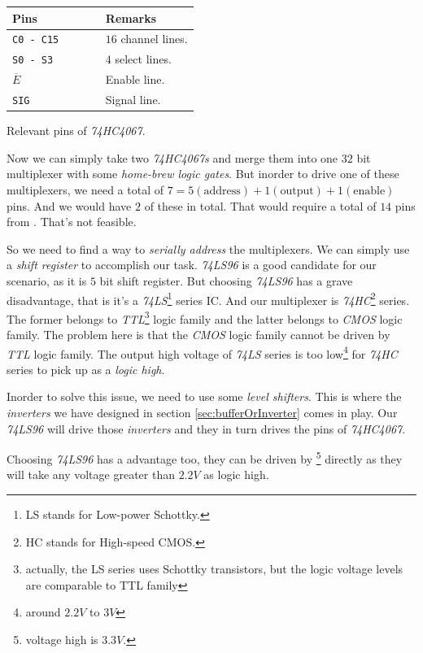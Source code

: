 \documentclass[../../main]{subfiles}
\begin{document}
\begin{center}
{\begin{minipage}[c] {0.52\textwidth}
    \end{minipage}}

\end{center}

\begin{center}
    \begin{xltabular} {\linewidth} {
            *{1}{>{\centering\arraybackslash}m{0.5\linewidth}}
            *{1}{>{\centering\arraybackslash}m{0.5\linewidth}}
        }
        \toprule
        Pins & Remarks \\
        \midrule
        \texttt{C0 - C15} & $16$ channel lines. \\
        \texttt{S0 - S3} & $4$ select lines. \\
        \texttt{$\overline{E}$} & Enable line. \\
        \texttt{SIG} & Signal line. \\
        \bottomrule
    \end{xltabular}
     {
        Relevant pins of \emph{74HC4067}.
        \label{tbl:74hc4067RelventPins}
    }
\end{center}

Now we can simply take two \emph{74HC4067s} and merge them into one $32$ bit multiplexer with
some \emph{home-brew logic gates}. But inorder to drive one of these multiplexers, we need
a total of $7 = 5 (\mbox{address}) + 1 (\mbox{output}) + 1 (\mbox{enable})$ pins. And we would
have $2$ of these in total. That would require a total of $14$ pins from \esp. That's not
feasible.

So we need to find a way to \emph{serially address} the multiplexers. We can simply use a
\emph{shift register} to accomplish our task. \emph{74LS96} is a good candidate for our
scenario, as it is $5$ bit shift register. But choosing \emph{74LS96} has a grave disadvantage,
that is it's a \emph{74LS}\footnote{LS stands for Low-power Schottky.} series IC.
And our multiplexer is \emph{74HC}\footnote{HC stands for High-speed CMOS.} series. The former
belongs to \emph{TTL}\footnote{actually, the LS series uses Schottky transistors, but the
logic voltage levels are comparable to TTL family} logic family and the latter belongs to
\emph{CMOS} logic family. The problem here is that the \emph{CMOS} logic family cannot be driven
by \emph{TTL} logic family. The output high voltage of \emph{74LS} series is too low\footnote{around
$2.2\si{V}$ to $3\si{V}$} for \emph{74HC} series to pick up as a \emph{logic high}.

Inorder to solve this issue, we need to use some \emph{level shifters}. This is where the
\emph{inverters} we have designed in section \ref{sec:bufferOrInverter} comes in play.
Our \emph{74LS96} will drive those \emph{inverters} and they in turn drives the pins of
\emph{74HC4067}.

Choosing \emph{74LS96} has a advantage too, they can be driven by \esp\footnote{voltage high is
$3.3\si{V}$.} directly as they will take any voltage greater than $2.2\si{V}$ as logic high.
\end{document}
